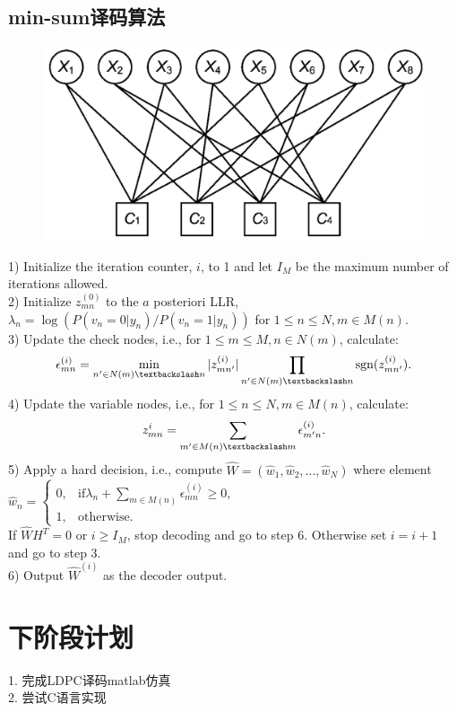 \documentclass{article}
\begin{document}
\subsection{min-sum译码算法}
\begin{figure}[H]
	\centering
	\includegraphics[width = .4\textwidth]{Tanner.png}
\end{figure}

1) Initialize the iteration counter, $i$, to 1 and let $I_M$ be the maximum number of 
iterations allowed.\\
2) Initialize $z^{(0)}_{mn}$ to the $a$ posteriori LLR, $\lambda _n=\log(P(v_n=0|y_n)/
P(v_n=1|y_n))$ for $1\leq n\leq N,m\in M(n)$.\\
3) Update the check nodes, i.e., for $1\leq m\leq M, n\in N(m)$, calculate:
\begin{equation}
	\epsilon^{(i)}_{mn}=\min_{n'\in N(m)\textbackslash n}|z^{(i)}_{mn'}|\prod_{n'\in 
	N(m)\textbackslash n}\mathrm {sgn}(z^{(i)}_{mn'}).
\end{equation}
4) Update the variable nodes, i.e., for $1\leq n \leq N,m\in M(n)$, calculate:
\begin{equation}
	z^{i}_{mn}=\sum_{m'\in M(n)\textbackslash m}\epsilon^{(i)}_{m'n}.
\end{equation}
5) Apply a hard decision, i.e., compute $\hat{W}=(\hat{w}_1,\hat{w}_2,...,\hat{w}_N)$
where element $\hat{w}_n=\left\{\begin{aligned}
	0, & \mathrm{if} \lambda _n+\sum\nolimits_{m\in M(n)}\epsilon^{(i)}_{mn}\geq 0, \\
	1, & \mathrm{otherwise}.\end{aligned}
	\right.$\\
If $\hat{W}H^T=0$ or $i\geq I_M$, stop decoding and go to step 6. Otherwise set 
$i=i+1$ and go to step 3.\\
6) Output $\hat{W}^{(i)}$ as the decoder output.






\section{下阶段计划}
1. 完成LDPC译码matlab仿真\\
2. 尝试C语言实现
\end{document}

